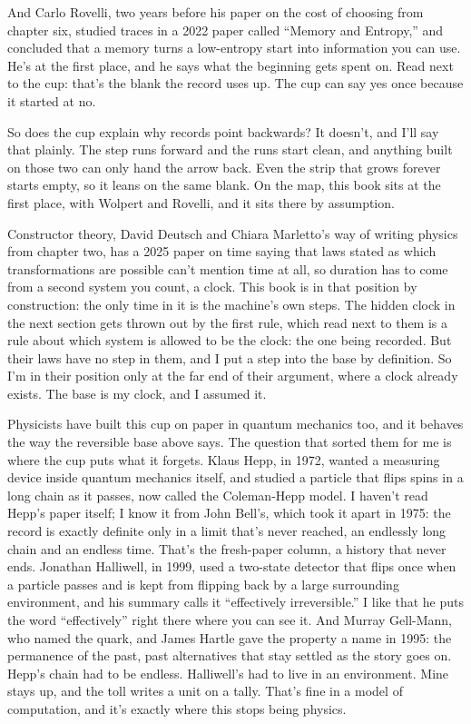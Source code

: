 \documentclass[11pt,twoside]{article}
\theoremstyle{thielethm}
\theoremstyle{thieledef}
\theoremstyle{thieledef}
\theoremstyle{thieledef}
\theoremstyle{thielethm}
\theoremstyle{thieleobs}
\theoremstyle{thielethm}
\begin{document}
And Carlo Rovelli, two years before his paper on the cost of choosing from chapter six, studied traces in a 2022 paper called ``Memory and Entropy,'' and concluded that a memory turns a low-entropy start into information you can use. He's at the first place, and he says what the beginning gets spent on. Read next to the cup: that's the blank the record uses up. The cup can say yes once because it started at no.

So does the cup explain why records point backwards? It doesn't, and I'll say that plainly. The step runs forward and the runs start clean, and anything built on those two can only hand the arrow back. Even the strip that grows forever starts empty, so it leans on the same blank. On the map, this book sits at the first place, with Wolpert and Rovelli, and it sits there by assumption.

Constructor theory, David Deutsch and Chiara Marletto's way of writing physics from chapter two, has a 2025 paper on time saying that laws stated as which transformations are possible can't mention time at all, so duration has to come from a second system you count, a clock. This book is in that position by construction: the only time in it is the machine's own steps. The hidden clock in the next section gets thrown out by the first rule, which read next to them is a rule about which system is allowed to be the clock: the one being recorded. But their laws have no step in them, and I put a step into the base by definition. So I'm in their position only at the far end of their argument, where a clock already exists. The base is my clock, and I assumed it.

Physicists have built this cup on paper in quantum mechanics too, and it behaves the way the reversible base above says. The question that sorted them for me is where the cup puts what it forgets. Klaus Hepp, in 1972, wanted a measuring device inside quantum mechanics itself, and studied a particle that flips spins in a long chain as it passes, now called the Coleman-Hepp model. I haven't read Hepp's paper itself; I know it from John Bell's, which took it apart in 1975: the record is exactly definite only in a limit that's never reached, an endlessly long chain and an endless time. That's the fresh-paper column, a history that never ends. Jonathan Halliwell, in 1999, used a two-state detector that flips once when a particle passes and is kept from flipping back by a large surrounding environment, and his summary calls it ``effectively irreversible.'' I like that he puts the word ``effectively'' right there where you can see it. And Murray Gell-Mann, who named the quark, and James Hartle gave the property a name in 1995: the permanence of the past, past alternatives that stay settled as the story goes on. Hepp's chain had to be endless. Halliwell's had to live in an environment. Mine stays up, and the toll writes a unit on a tally. That's fine in a model of computation, and it's exactly where this stops being physics.
\end{document}
